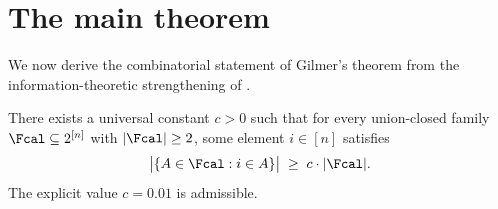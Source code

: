 \section{The main theorem}
\label{sec:main}

We now derive the combinatorial statement of Gilmer's theorem from the
information-theoretic strengthening of .

\begin{theorem}\label{thm:main}
There exists a universal constant $c > 0$ such that for every union-closed
family $\Fcal \subseteq 2^{[n]}$ with $|\Fcal| \ge 2$, some element
$i \in [n]$ satisfies
\begin{align}\label{eq:main}
\bigl| \{ A \in \Fcal : i \in A \} \bigr| \;\ge\; c \cdot |\Fcal|.
\end{align}
The explicit value $c = 0.01$ is admissible.
\end{theorem}

